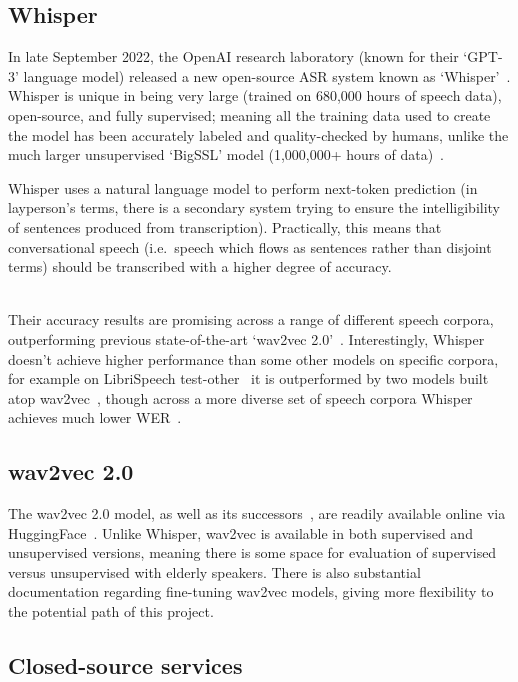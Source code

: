 \subsection{Whisper}\label{subsec:whisper}

In late September 2022, the OpenAI research laboratory (known for their `GPT-3' language model)
released a new open-source ASR system known as `Whisper'~\cite{whisper}.
Whisper is unique in being very large (trained on 680,000 hours of speech data), open-source, and
fully supervised;
meaning all the training data used to create the model has been accurately labeled and
quality-checked by humans, unlike the much larger unsupervised `BigSSL' model (1,000,000+ hours
of data)~\cite{bigssl}.

Whisper uses a natural language model to perform next-token prediction (in layperson's
terms, there is a secondary system trying to ensure the intelligibility of sentences produced
from transcription).
Practically, this means that conversational speech (i.e.\ speech which flows as sentences rather
than disjoint terms) should be transcribed with a higher degree of accuracy.

\\
Their accuracy results are promising across a range of different speech corpora, outperforming
previous state-of-the-art `wav2vec 2.0'~\cite{wav2vec}.
Interestingly, Whisper doesn't achieve higher performance than some other models on specific
corpora, for example on LibriSpeech test-other~\cite{librispeech} it is outperformed by
two models built atop wav2vec~\cite{zhang2020,chung2021}, though across a more diverse set
of speech corpora Whisper achieves much lower WER~\cite{whisper}.

\subsection{wav2vec 2.0}\label{subsec:wav2vec}

The wav2vec 2.0 model, as well as its successors~\cite{wav2vec, chung2021, zhang2020}, are
readily available online via HuggingFace~\cite{huggingfacetransformers}.
Unlike Whisper, wav2vec is available in both supervised and unsupervised versions, meaning there
is some space for evaluation of supervised versus unsupervised with elderly speakers.
There is also substantial documentation regarding fine-tuning wav2vec models, giving more
flexibility to the potential path of this project.

\subsection{Closed-source services}\label{subsec:closed-source-services}

